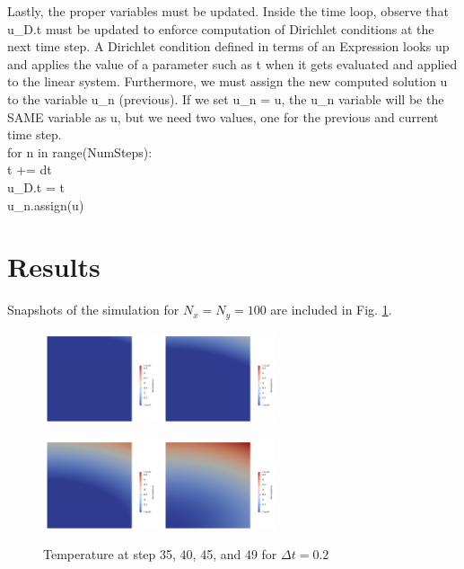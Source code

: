 \documentclass[12pt,3p]{article}
\begin{document}
Lastly, the proper variables must be updated. Inside the time loop, observe that u\_D.t must be updated to enforce computation of Dirichlet conditions at the next time step. A Dirichlet condition defined in terms of an Expression looks up and applies the value of a parameter such as t when it gets evaluated and applied to the linear system. Furthermore, we must assign the new computed solution u to the variable u\_n (previous). If we set u\_n = u, the u\_n variable will be the SAME variable as u, but we need two values, one for the previous and current time step.\\
{\selectfont
for n in range(NumSteps): \\
\indent t += dt \\
\indent u\_D.t = t  \\
\indent  u\_n.assign(u) 
}

\newpage
\section{Results}
\vspace{-2ex}
Snapshots of the simulation for $N_x = N_y = 100$ are included in Fig. \ref{FigScreenshots}. 

\begin{figure}[!htb]
\centering
\includegraphics[width=0.3\textwidth]{./Results/Interpolate/S_50_N_100/TempCrop/Temp_35}
\includegraphics[width=0.3\textwidth]{./Results/Interpolate/S_50_N_100/TempCrop/Temp_40} 

\includegraphics[width=0.3\textwidth]{./Results/Interpolate/S_50_N_100/TempCrop/Temp_45}
\includegraphics[width=0.3\textwidth]{./Results/Interpolate/S_50_N_100/TempCrop/Temp_49}
\caption{Temperature at step 35, 40, 45, and 49 for $\Delta t = 0.2$}
\label{FigScreenshots}
\end{figure}
\end{document}
